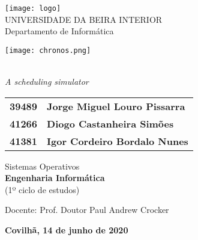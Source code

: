 \begin{titlepage}
\begin{center}

\begin{flushleft}
\texttt{[image: logo]}\\
\rostoubi UNIVERSIDADE DA BEIRA INTERIOR\\
\rostofac Departamento de Informática\\
\end{flushleft}

\vspace{1.5cm}

\begin{center}
\texttt{[image: chronos.png]}
\end{center}

\rostotitulo \textbf{\chronOS~\version} \\
\rostosubtit \textit{A scheduling simulator}\\

\vspace{1.8cm}

\begin{tabular}{>{\rostonomes\bfseries}l @{\rostonomes\bfseries~---~} >{\rostonomes\bfseries}l}
	39489 & Jorge Miguel Louro Pissarra \\
	41266 & Diogo Castanheira Simões \\
	41381 & Igor Cordeiro Bordalo Nunes \\
\end{tabular}

\vspace{1.4cm}

\rostooutros Sistemas Operativos\\
\rostonomes \textbf{Engenharia Informática}\\
\rostooutros (1º ciclo de estudos)\\

\vspace{2.1cm}

\rostooutros Docente: Prof. Doutor Paul Andrew Crocker\\

\vspace{1.2cm}

\rostooutros \textbf{Covilhã, 14 de junho de 2020}

\end{center}
\end{titlepage}

